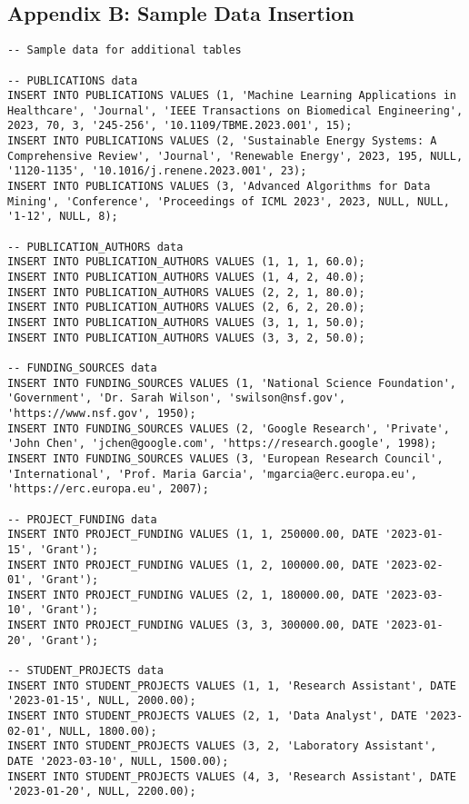 \documentclass[12pt,a4paper]{article}
\begin{document}
\subsection{Appendix B: Sample Data Insertion}
\begin{lstlisting}[style=sqlstyle]
-- Sample data for additional tables

-- PUBLICATIONS data
INSERT INTO PUBLICATIONS VALUES (1, 'Machine Learning Applications in Healthcare', 'Journal', 'IEEE Transactions on Biomedical Engineering', 2023, 70, 3, '245-256', '10.1109/TBME.2023.001', 15);
INSERT INTO PUBLICATIONS VALUES (2, 'Sustainable Energy Systems: A Comprehensive Review', 'Journal', 'Renewable Energy', 2023, 195, NULL, '1120-1135', '10.1016/j.renene.2023.001', 23);
INSERT INTO PUBLICATIONS VALUES (3, 'Advanced Algorithms for Data Mining', 'Conference', 'Proceedings of ICML 2023', 2023, NULL, NULL, '1-12', NULL, 8);

-- PUBLICATION_AUTHORS data
INSERT INTO PUBLICATION_AUTHORS VALUES (1, 1, 1, 60.0);
INSERT INTO PUBLICATION_AUTHORS VALUES (1, 4, 2, 40.0);
INSERT INTO PUBLICATION_AUTHORS VALUES (2, 2, 1, 80.0);
INSERT INTO PUBLICATION_AUTHORS VALUES (2, 6, 2, 20.0);
INSERT INTO PUBLICATION_AUTHORS VALUES (3, 1, 1, 50.0);
INSERT INTO PUBLICATION_AUTHORS VALUES (3, 3, 2, 50.0);

-- FUNDING_SOURCES data
INSERT INTO FUNDING_SOURCES VALUES (1, 'National Science Foundation', 'Government', 'Dr. Sarah Wilson', 'swilson@nsf.gov', 'https://www.nsf.gov', 1950);
INSERT INTO FUNDING_SOURCES VALUES (2, 'Google Research', 'Private', 'John Chen', 'jchen@google.com', 'https://research.google', 1998);
INSERT INTO FUNDING_SOURCES VALUES (3, 'European Research Council', 'International', 'Prof. Maria Garcia', 'mgarcia@erc.europa.eu', 'https://erc.europa.eu', 2007);

-- PROJECT_FUNDING data
INSERT INTO PROJECT_FUNDING VALUES (1, 1, 250000.00, DATE '2023-01-15', 'Grant');
INSERT INTO PROJECT_FUNDING VALUES (1, 2, 100000.00, DATE '2023-02-01', 'Grant');
INSERT INTO PROJECT_FUNDING VALUES (2, 1, 180000.00, DATE '2023-03-10', 'Grant');
INSERT INTO PROJECT_FUNDING VALUES (3, 3, 300000.00, DATE '2023-01-20', 'Grant');

-- STUDENT_PROJECTS data
INSERT INTO STUDENT_PROJECTS VALUES (1, 1, 'Research Assistant', DATE '2023-01-15', NULL, 2000.00);
INSERT INTO STUDENT_PROJECTS VALUES (2, 1, 'Data Analyst', DATE '2023-02-01', NULL, 1800.00);
INSERT INTO STUDENT_PROJECTS VALUES (3, 2, 'Laboratory Assistant', DATE '2023-03-10', NULL, 1500.00);
INSERT INTO STUDENT_PROJECTS VALUES (4, 3, 'Research Assistant', DATE '2023-01-20', NULL, 2200.00);
\end{lstlisting}
\end{document}
